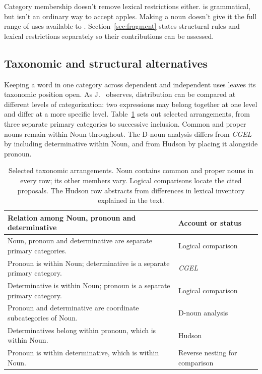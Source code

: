 \documentclass[12pt]{article}
\begin{document}
Category membership doesn't remove lexical restrictions either.  is grammatical, but  isn't an ordinary way to accept apples. Making  a noun doesn't give it the full range of uses available to . Section~\ref{sec:fragment} states structural rules and lexical restrictions separately so their contributions can be assessed.

\subsection{Taxonomic and structural alternatives}\label{sec:related}

Keeping a word in one category across dependent and independent uses leaves its taxonomic position open. As J.~\textcite[232--235]{lyons1968} observes, distribution can be compared at different levels of categorization: two expressions may belong together at one level and differ at a more specific level. Table~\ref{tab:rivals} sets out selected arrangements, from three separate primary categories to successive inclusion. Common and proper nouns remain within Noun throughout. The D-noun analysis differs from \textit{CGEL} by including determinative within Noun, and from Hudson by placing it alongside pronoun.

\begin{table}[H]
\centering\small
\caption{Selected taxonomic arrangements. Noun contains common and proper nouns in every row; its other members vary. Logical comparisons locate the cited proposals. The Hudson row abstracts from differences in lexical inventory explained in the text.}\label{tab:rivals}
\begin{tabular}{>{\raggedright\arraybackslash}p{8.7cm}>{\raggedright\arraybackslash}p{3cm}}
\toprule
Relation among Noun, pronoun and determinative & Account or status \\
\midrule
Noun, pronoun and determinative are separate primary categories. & Logical comparison \\
Pronoun is within Noun; determinative is a separate primary category. & \textit{CGEL} \\
Determinative is within Noun; pronoun is a separate primary category. & Logical comparison \\
Pronoun and determinative are coordinate subcategories of Noun. & D-noun analysis \\
Determinatives belong within pronoun, which is within Noun. & Hudson \\
Pronoun is within determinative, which is within Noun. & Reverse nesting for comparison \\
\bottomrule
\end{tabular}
\end{table}
\end{document}
